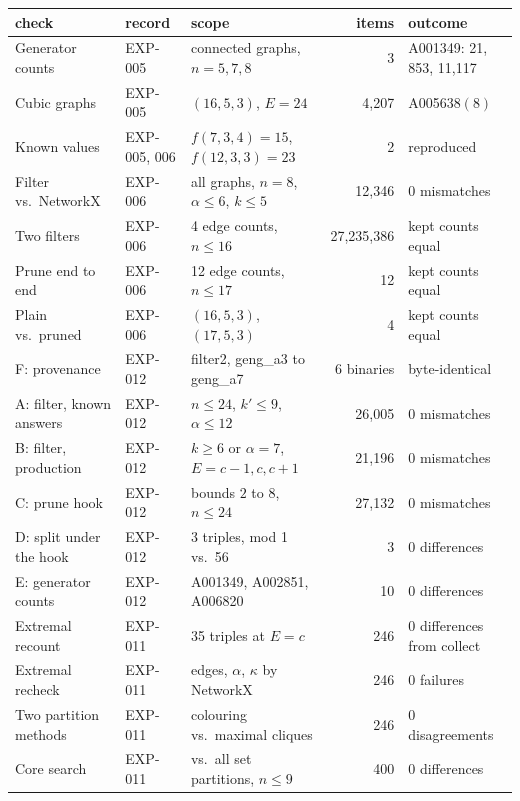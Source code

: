 \begin{tabular}{lllrl}
\toprule
check & record & scope & items & outcome \\
\midrule
Generator counts & EXP-005 & connected graphs, $n=5,7,8$ & 3 & A001349: 21, 853, 11{,}117 \\
Cubic graphs & EXP-005 & $(16,5,3)$, $E=24$ & 4{,}207 & A005638$(8)$ \\
Known values & EXP-005, 006 & $f(7,3,4)=15$, $f(12,3,3)=23$ & 2 & reproduced \\
Filter vs.\ NetworkX & EXP-006 & all graphs, $n=8$, $\alpha\le6$, $k\le5$ & 12{,}346 & 0 mismatches \\
Two filters & EXP-006 & 4 edge counts, $n\le16$ & 27{,}235{,}386 & kept counts equal \\
Prune end to end & EXP-006 & 12 edge counts, $n\le17$ & 12 & kept counts equal \\
Plain vs.\ pruned & EXP-006 & $(16,5,3)$, $(17,5,3)$ & 4 & kept counts equal \\
F: provenance & EXP-012 & filter2, geng\_a3 to geng\_a7 & 6 binaries & byte-identical \\
A: filter, known answers & EXP-012 & $n\le24$, $k'\le9$, $\alpha\le12$ & 26{,}005 & 0 mismatches \\
B: filter, production & EXP-012 & $k\ge6$ or $\alpha=7$, $E=c-1,c,c+1$ & 21{,}196 & 0 mismatches \\
C: prune hook & EXP-012 & bounds $2$ to $8$, $n\le24$ & 27{,}132 & 0 mismatches \\
D: split under the hook & EXP-012 & 3 triples, mod 1 vs.\ 56 & 3 & 0 differences \\
E: generator counts & EXP-012 & A001349, A002851, A006820 & 10 & 0 differences \\
Extremal recount & EXP-011 & 35 triples at $E=c$ & 246 & 0 differences from collect \\
Extremal recheck & EXP-011 & edges, $\alpha$, $\kappa$ by NetworkX & 246 & 0 failures \\
Two partition methods & EXP-011 & colouring vs.\ maximal cliques & 246 & 0 disagreements \\
Core search & EXP-011 & vs.\ all set partitions, $n\le9$ & 400 & 0 differences \\
\bottomrule
\end{tabular}

